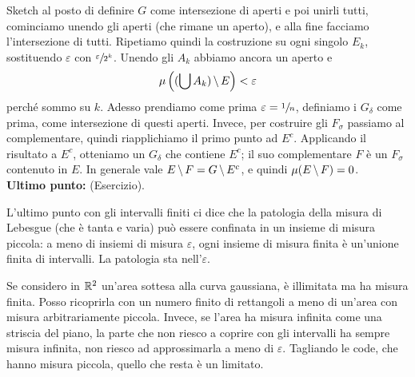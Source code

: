 \documentclass[a4paper]{article}
\begin{document}
\begin{radioactive}
\begin{snippetproof}{Sketch}
    al posto di definire \(G\) come intersezione di aperti e poi unirli tutti,
    cominciamo unendo gli aperti (che rimane un aperto), e alla fine facciamo l'intersezione di tutti.
    Ripetiamo quindi la costruzione su ogni singolo \(E_k\),
    sostituendo \(\varepsilon\) con \(\sfrac{\varepsilon}{2^k}\).
    Unendo gli \(A_k\) abbiamo ancora un aperto e \[
        \mu\left((\bigcup A_k) \,\backslash\, E\right) < \varepsilon
    \]
    perché sommo su \(k\).
    Adesso prendiamo come prima \(\varepsilon = \sfrac1n\),
    definiamo i \(G_\delta\) come prima, come intersezione di questi aperti.
    Invece, per costruire gli \(F_\sigma\) passiamo al complementare,
    quindi riapplichiamo il primo punto ad \(E^c\).
    Applicando il risultato a \(E^c\), otteniamo un \(G_\delta\) che contiene \(E^c\); il suo complementare \(F\) è un \(F_\sigma\) contenuto in \(E\).
    In generale vale \(E \,\backslash\, F = G \,\backslash\, E^c\),
    e quindi \(\mu(E \,\backslash\, F) = 0\). \\
    \textbf{Ultimo punto:} (Esercizio).
\end{snippetproof}
\end{radioactive}

\begin{radioactive}
L'ultimo punto con gli intervalli finiti ci dice che la patologia della misura di Lebesgue
(che è tanta e varia) può essere confinata in un insieme di misura piccola: a meno di
insiemi di misura \(\varepsilon\), ogni insieme di misura finita
è un'unione finita di intervalli. La patologia sta nell'\(\varepsilon\).
\end{radioactive}

\begin{radioactive}
\begin{snippetexample}{}
    Se considero in \(\mathbb{R}^2\) un'area sottesa alla curva gaussiana,
    è illimitata ma ha misura finita. Posso ricoprirla con un numero finito di rettangoli
    a meno di un'area con misura arbitrariamente piccola.
    Invece, se l'area ha misura infinita come una striscia del piano, la parte che non riesco a coprire
    con gli intervalli ha sempre misura infinita, non riesco ad approssimarla a meno di \(\varepsilon\).
    Tagliando le code, che hanno misura piccola,
    quello che resta è un limitato.
\end{snippetexample}
\end{radioactive}
\end{document}
